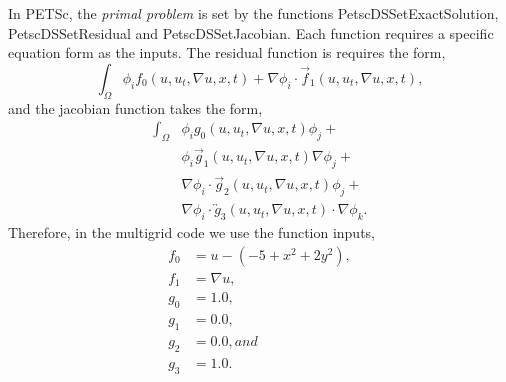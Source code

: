 \documentclass[]{article}
\begin{document}
In PETSc, the \textit{primal problem} is set by the functions PetscDSSetExactSolution, PetscDSSetResidual and PetscDSSetJacobian.  Each function requires a specific equation form as the inputs.  The residual function is requires the form,
\begin{equation}
\int_\Omega \phi_i f_0(u, u_t, \nabla u, x, t) + \nabla\phi_i \cdot {\vec f}_1(u, u_t, \nabla u, x, t),
\end{equation}
and the jacobian function takes the form,
\begin{equation}
\begin{split}
\int_\Omega &\phi_i g_0(u, u_t, \nabla u, x, t) \phi_j + \\
&\phi_i {\vec g}_1(u, u_t, \nabla u, x, t) \nabla \phi_j + \\
&\nabla\phi_i \cdot {\vec g}_2(u, u_t, \nabla u, x, t) \phi_j + \\
&\nabla\phi_i \cdot {\overleftrightarrow g}_3(u, u_t, \nabla u, x, t) \cdot \nabla \phi_k.
\end{split}
\end{equation}
Therefore, in the multigrid code we use the function inputs,
\begin{align}
f_0 &= u - (-5 + x^2 + 2 y^2), \\
f_1 &= \nabla u, \\
g_0 &= 1.0, \\
g_1 &= 0.0, \\
g_2 &= 0.0, and \\
g_3 &= 1.0.
\end{align}




\printbibliography 
\end{document}
